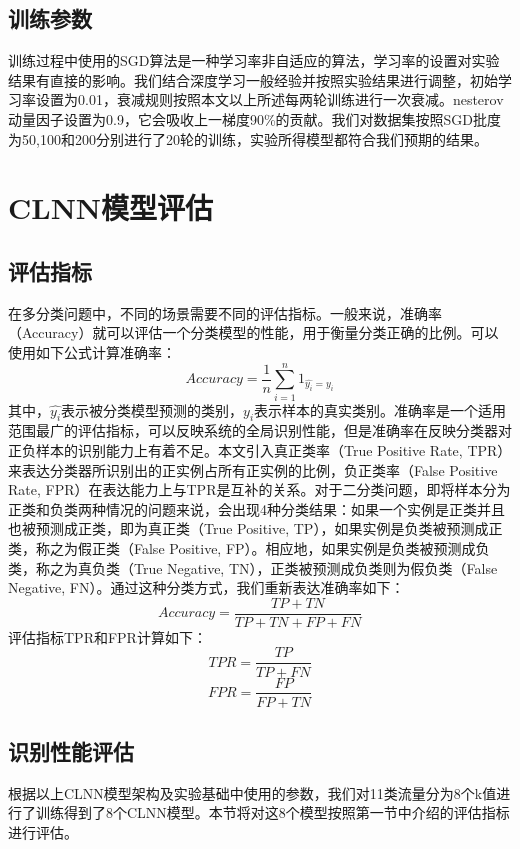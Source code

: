 \subsection{训练参数}
训练过程中使用的SGD算法是一种学习率非自适应的算法，学习率的设置对实验结果有直接的影响。我们结合深度学习一般经验并按照实验结果进行调整，初始学习率设置为0.01，衰减规则按照本文以上所述每两轮训练进行一次衰减。nesterov动量因子设置为0.9，它会吸收上一梯度90\%的贡献。我们对数据集按照SGD批度为50,100和200分别进行了20轮的训练，实验所得模型都符合我们预期的结果。


\section{CLNN模型评估}
\subsection{评估指标}
在多分类问题中，不同的场景需要不同的评估指标。一般来说，准确率（Accuracy）就可以评估一个分类模型的性能，用于衡量分类正确的比例。可以使用如下公式计算准确率：
\begin{equation}
Accuracy = \frac{1}{n} \sum\limits_{i = 1}^n {1_{\hat{y_i}={y_i}}}
\end{equation}
其中，$\hat{y_i}$表示被分类模型预测的类别，${y_i}$表示样本的真实类别。准确率是一个适用范围最广的评估指标，可以反映系统的全局识别性能，但是准确率在反映分类器对正负样本的识别能力上有着不足。本文引入真正类率（True Positive Rate, TPR）来表达分类器所识别出的正实例占所有正实例的比例，负正类率（False Positive Rate, FPR）在表达能力上与TPR是互补的关系。对于二分类问题，即将样本分为正类和负类两种情况的问题来说，会出现4种分类结果：如果一个实例是正类并且也被预测成正类，即为真正类（True Positive, TP），如果实例是负类被预测成正类，称之为假正类（False Positive, FP）。相应地，如果实例是负类被预测成负类，称之为真负类（True Negative, TN），正类被预测成负类则为假负类（False Negative, FN）。通过这种分类方式，我们重新表达准确率如下：
\begin{equation}
Accuracy = \frac{{TP + TN}}{{TP + TN + FP + FN}} 
\end{equation}
评估指标TPR和FPR计算如下：
\begin{equation}
TPR = \frac{{TP}}{{TP + FN}}
\end{equation}
\begin{equation}
FPR = \frac{{FP}}{{FP + TN}}
\end{equation}
\subsection{识别性能评估}
根据以上CLNN模型架构及实验基础中使用的参数，我们对11类流量分为8个k值进行了训练得到了8个CLNN模型。本节将对这8个模型按照第一节中介绍的评估指标进行评估。

